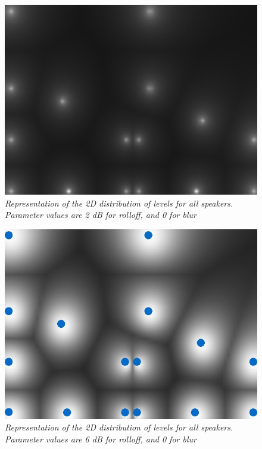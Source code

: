 \documentclass[twoside,10pt]{article}
\begin{document}
\begin{figure}[ht]
\centerline{\includegraphics[scale=0.5]{all_r_2_b_0}}
\caption{{\it Representation of the 2D distribution of levels for all speakers. Parameter values are 2 dB for rolloff, and 0 for blur}}  
\label{fig:allspk1}
\end{figure}

\begin{figure}[ht]
\centerline{\includegraphics[scale=0.5]{all_r_6_b_0}}
\caption{{\it Representation of the 2D distribution of levels for all speakers. Parameter values are 6 dB for rolloff, and 0 for blur}}  
\label{fig:allspk2}
\end{figure}
\end{document}
